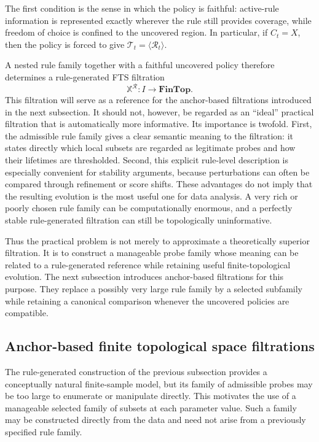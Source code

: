 \documentclass[a4paper,11pt]{article}
\theoremstyle{definition}
\theoremstyle{remark}
\begin{document}
The first condition is the sense in which the policy is faithful: active-rule information is represented exactly wherever the rule still provides coverage, while freedom of choice is confined to the uncovered region. In particular, if $C_t=X$, then the policy is forced to give $\mathcal T_t=\langle\mathcal R_t\rangle$.

A nested rule family together with a faithful uncovered policy therefore determines a rule-generated FTS filtration
$$
\mathbb X^{\mathcal R}\colon I\longrightarrow\mathbf{FinTop}.
$$
This filtration will serve as a reference for the anchor-based filtrations introduced in the next subsection. It should not, however, be regarded as an ``ideal'' practical filtration that is automatically more informative. Its importance is twofold. First, the admissible rule family gives a clear semantic meaning to the filtration: it states directly which local subsets are regarded as legitimate probes and how their lifetimes are thresholded. Second, this explicit rule-level description is especially convenient for stability arguments, because perturbations can often be compared through refinement or score shifts. These advantages do not imply that the resulting evolution is the most useful one for data analysis. A very rich or poorly chosen rule family can be computationally enormous, and a perfectly stable rule-generated filtration can still be topologically uninformative.

Thus the practical problem is not merely to approximate a theoretically superior filtration. It is to construct a manageable probe family whose meaning can be related to a rule-generated reference while retaining useful finite-topological evolution. The next subsection introduces anchor-based filtrations for this purpose. They replace a possibly very large rule family by a selected subfamily while retaining a canonical comparison whenever the uncovered policies are compatible.


\subsection{Anchor-based finite topological space filtrations}
\label{subsec:anchor-based}

The rule-generated construction of the previous subsection provides a conceptually natural finite-sample model, but its family of admissible probes may be too large to enumerate or manipulate directly. This motivates the use of a manageable selected family of subsets at each parameter value. Such a family may be constructed directly from the data and need not arise from a previously specified rule family.
\end{document}
